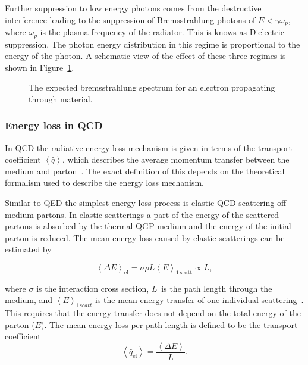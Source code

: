 Further suppression to low energy photons comes from the destructive interference leading to the suppression of Bremsstrahlung photons of $E < \gamma \omega_p$, where $\omega_p$ is the plasma frequency of the radiator. This is knows as Dielectric suppression. The photon energy distribution in this regime is proportional to the energy of the photon. A schematic view of the effect of these three regimes is shown in Figure~\ref{fig:bremsstrahlung}.

\begin{figure}[htb]
\centering


\caption[Photon spectrum]{ The expected bremsstrahlung spectrum for an electron propagating through material.}
\label{fig:bremsstrahlung}
\end{figure}

\subsubsection*{Energy loss in QCD}
In QCD the radiative energy loss mechanism is given in terms of the transport coefficient $\left<\hat q\right>$, which describes the average momentum transfer between the medium and parton~\cite{jetBroadeningPpb1}. The exact definition of this depends on the theoretical formalism used to describe the energy loss mechanism. 

Similar to QED the simplest energy loss process is elastic QCD scattering off medium partons. In elastic scatterings a part of the energy of the scattered partons is absorbed by the thermal QGP medium and the energy of the initial parton is reduced. The mean energy loss caused by elastic scatterings can be estimated by

\begin{equation}
\left<\Delta E\right>_{\mathrm{el}}=\sigma \rho L \left<E\right>_{\mathrm{1\,scatt}}\propto L,
\label{eq:elastic}
\end{equation}

\noindent where $\sigma$ is the interaction cross section, $L$ is the path length through the medium, and $\left<E\right>_{1 scatt}$ is the mean energy transfer of one individual scattering~\cite{Majumder:2010qh}. This requires that the energy transfer does not depend on the total energy of the parton ($E$). The mean energy loss per path length is defined to be the transport coefficient \begin{equation}
\left< \hat q_\mathrm{el}\right> = \frac{\left< \Delta E\right>}{L}.
\end{equation}

